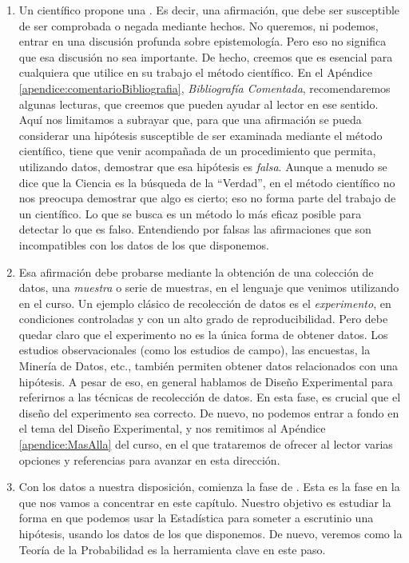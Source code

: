     \begin{enumerate}
        \item Un científico propone una . Es decir, una afirmación, que debe ser susceptible de ser comprobada o negada mediante hechos. No queremos, ni podemos, entrar en una discusión profunda sobre epistemología. Pero eso no significa que esa discusión no sea importante. De hecho, creemos que es esencial para cualquiera que utilice en su trabajo el método científico. En el Apéndice \ref{apendice:comentarioBibliografia}, {\em Bibliografía Comentada}, recomendaremos algunas lecturas, que creemos que pueden ayudar al lector en ese sentido. Aquí nos limitamos a subrayar que, para que una afirmación se pueda considerar una hipótesis susceptible de ser examinada mediante el método científico, tiene que venir acompañada de un procedimiento que permita, utilizando datos, demostrar que esa hipótesis es {\em falsa}. Aunque a menudo se dice que la Ciencia es la búsqueda de la ``Verdad'', en el método científico no nos preocupa demostrar que algo es cierto; eso no forma parte del trabajo de un científico. Lo que se busca es un método lo más eficaz posible para detectar lo que es falso. Entendiendo por falsas las afirmaciones que son incompatibles con los datos de los que disponemos.

        \item Esa afirmación debe probarse mediante la obtención de una colección de datos, una {\em muestra} o serie de muestras, en el lenguaje que venimos utilizando en el curso. Un ejemplo clásico de recolección de datos es el {\em experimento}, en condiciones controladas y con un alto grado de reproducibilidad. Pero debe quedar claro que el experimento no es la única forma de obtener datos. Los estudios observacionales (como los estudios de campo), las encuestas, la Minería de Datos, etc., también permiten obtener datos relacionados con una hipótesis.  A pesar de eso, en general hablamos de Diseño Experimental para referirnos a las técnicas de recolección de datos. En esta fase, es crucial que el diseño del experimento sea correcto. De nuevo, no podemos entrar a fondo en el tema del Diseño Experimental, y nos remitimos al Apéndice \ref{apendice:MasAlla} del curso, en el que trataremos de ofrecer al lector varias opciones y referencias para avanzar en esta dirección.

        \item Con los datos a nuestra disposición, comienza la fase de . Esta es la fase en la que nos vamos a concentrar en este capítulo. Nuestro objetivo es estudiar la forma en que podemos usar la Estadística para someter a escrutinio una hipótesis, usando los datos de los que disponemos. De nuevo, veremos como la Teoría de la Probabilidad es la herramienta clave en este paso.
    \end{enumerate}

